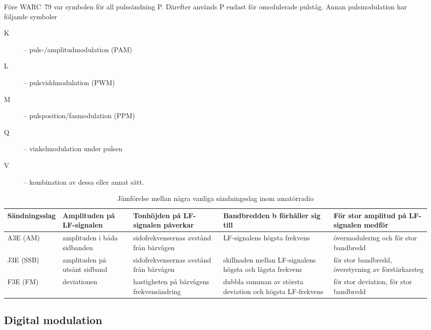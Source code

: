 Före WARC~79 var symbolen för all pulssändning P.
Därefter används P endast för omodulerade pulståg.
Annan pulsmodulation har följande symboler

\begin{description}
\item[K] -- puls-/amplitudmodulation (PAM)
\item[L] -- pulsviddmodulation (PWM)
\item[M] -- pulsposition/fasmodulation (PPM)
\item[Q] -- vinkelmodulation under pulsen
\item[V] -- kombination av dessa eller annat sätt.
\end{description}

\begin{table*}[ht]
\begin{center}
\begin{tabular}{|L{.12\textwidth}|L{.18\textwidth}|L{.18\textwidth}|L{.18\textwidth}|L{.19\textwidth}|}
\hline
  Sändningsslag &
    Amplituden på LF-signalen &
    Tonhöjden på LF- signalen påverkar & 
    Bandbredden b förhåller sig till &
    För stor amplitud på LF-signalen medför \\
  \hline %
  A3E (AM) & 
    amplituden i båda sidbanden &
    sidofrekvensernas avstånd från bärvågen &
    LF-signalens högsta frekvens & 
    övermodulering och för stor bandbredd \\
\hline
  J3E (SSB) & 
    amplituden på utsänt sidband & 
    sidofrekvensernas avstånd från bärvågen  & 
    skillnaden mellan LF-signalens högsta och lägsta frekvens & 
    för stor bandbredd, överstyrning av förstärkarsteg \\
\hline
  F3E (FM) &
    deviationen & 
    hastigheten på bärvågens frekvensändring &
    dubbla summan av största deviation och högsta LF-frekvens & 
    för stor deviation, för stor bandbredd \\
  \hline %
\end{tabular}
\end{center}
\caption{Jämförelse mellan några vanliga sändningsslag inom amatörradio}
\end{table*}


\subsection{Digital modulation}
\label{modulation_digital}

